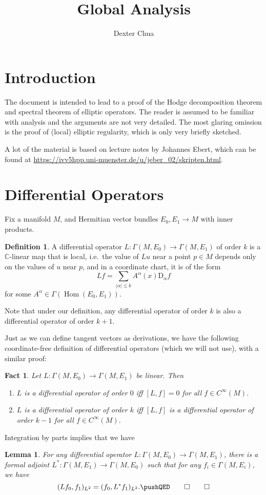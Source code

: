 \documentclass{shortart}
\title{Global Analysis}
\author{Dexter Chua}
\newtheorem*{lemma}{Lemma}
\newtheorem*{fact}{Fact}
\theoremstyle{definition}
\newtheorem*{defi}{Definition}
\newcommand\C{\mathbb{C}}
\newcommand\D{\mathrm{D}}
\DeclareMathOperator\Hom{Hom}
\begin{document}
\section{Introduction}
The document is intended to lead to a proof of the Hodge decomposition theorem and spectral theorem of elliptic operators. The reader is assumed to be familiar with analysis and the arguments are not very detailed. The most glaring omission is the proof of (local) elliptic regularity, which is only very briefly sketched.

A lot of the material is based on lecture notes by Johannes Ebert, which can be found at \url{https://ivv5hpp.uni-muenster.de/u/jeber_02/skripten.html}.

\section{Differential Operators}
Fix a manifold $M$, and Hermitian vector bundles $E_0, E_1 \to M$ with inner products.

\begin{defi}
  A differential operator $L: \Gamma(M, E_0) \to \Gamma(M, E_1)$ of order $k$ is a $\C$-linear map that is local, i.e.\ the value of $Lu$ near a point $p \in M$ depends only on the values of $u$ near $p$, and in a coordinate chart, it is of the form
  \[
    Lf = \sum_{|\alpha| \leq k} A^\alpha(x) \D_\alpha f
  \]
  for some $A^\alpha \in \Gamma(\Hom(E_0, E_1))$.
\end{defi}
Note that under our definition, any differential operator of order $k$ is also a differential operator of order $k + 1$.

Just as we can define tangent vectors as derivations, we have the following coordinate-free definition of differential operators (which we will not use), with a similar proof:
\begin{fact}
  Let $L: \Gamma(M, E_0) \to \Gamma(M, E_1)$ be linear. Then
  \begin{enumerate}
    \item $L$ is a differential operator of order $0$ iff $[L, f] = 0$ for all $f \in C^\infty(M)$.
    \item $L$ is a differential operator of order $k$ iff $[L, f]$ is a differential operator of order $k - 1$ for all $f \in C^\infty(M)$.\fakeqed
  \end{enumerate}
\end{fact}

Integration by parts implies that we have
\begin{lemma}
  For any differential operator $L: \Gamma(M, E_0) \to \Gamma(M, E_1)$, there is a \emph{formal adjoint} $L^*: \Gamma(M, E_1) \to \Gamma(M, E_0)$ such that for any $f_i \in \Gamma(M, E_i)$, we have
  \[
    (Lf_0, f_1)_{L^2} = (f_0, L^* f_1)_{L^2}.\fakeqed
  \]
\end{lemma}
\end{document}
